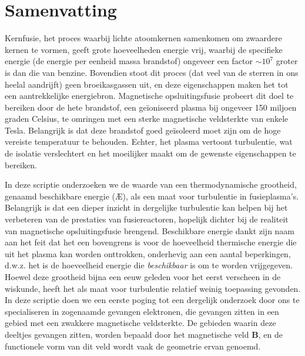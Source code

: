 \chapter*{Samenvatting}

Kernfusie, het proces waarbij lichte atoomkernen samenkomen om zwaardere kernen te vormen, geeft grote hoeveelheden energie vrij, waarbij de specifieke energie (de energie per eenheid massa brandstof) ongeveer een factor $\sim 10^7$ groter is dan die van benzine. Bovendien stoot dit proces (dat veel van de sterren in ons heelal aandrijft) geen broeikasgassen uit, en deze eigenschappen maken het tot een aantrekkelijke energiebron. Magnetische opsluitingsfusie probeert dit doel te bereiken door de hete brandstof, een geïoniseerd plasma bij ongeveer 150 miljoen graden Celsius, te omringen met een sterke magnetische veldsterkte van enkele Tesla. Belangrijk is dat deze brandstof goed geïsoleerd moet zijn om de hoge vereiste temperatuur te behouden. Echter, het plasma vertoont turbulentie, wat de isolatie verslechtert en het moeilijker maakt om de gewenste eigenschappen te bereiken. \par
In deze scriptie onderzoeken we de waarde van een thermodynamische grootheid, genaamd beschikbare energie (\AE{}), als een maat voor turbulentie in fusieplasma's. Belangrijk is dat een dieper inzicht in dergelijke turbulentie kan helpen bij het verbeteren van de prestaties van fusiereactoren, hopelijk dichter bij de realiteit van magnetische opsluitingsfusie brengend. Beschikbare energie dankt zijn naam aan het feit dat het een bovengrens is voor de hoeveelheid thermische energie die uit het plasma kan worden onttrokken, onderhevig aan een aantal beperkingen, d.w.z. het is de hoeveelheid energie die {\it beschikbaar} is om te worden vrijgegeven. Hoewel deze grootheid bijna een eeuw geleden voor het eerst verscheen in de wiskunde, heeft het als maat voor turbulentie relatief weinig toepassing gevonden. In deze scriptie doen we een eerste poging tot een dergelijk onderzoek door ons te specialiseren in zogenaamde gevangen elektronen, die gevangen zitten in een gebied met een zwakkere magnetische veldsterkte. De gebieden waarin deze deeltjes gevangen zitten, worden bepaald door het magnetische veld $\boldsymbol{B}$, en de functionele vorm van dit veld wordt vaak de geometrie ervan genoemd. \par

